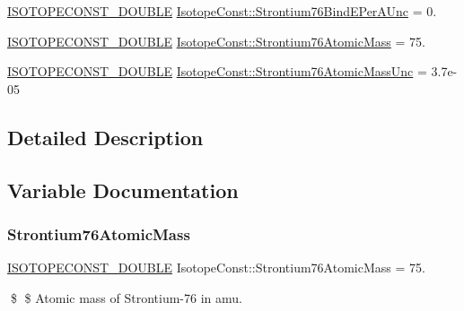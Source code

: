 \begin{DoxyCompactItemize}
\mbox{\hyperlink{group___isotope_const-_macros_ga8f45a7272ce02c0b4c65c44636ed719a}{I\+S\+O\+T\+O\+P\+E\+C\+O\+N\+S\+T\+\_\+\+D\+O\+U\+B\+LE}} \mbox{\hyperlink{group___isotope_const-_strontium-_sr76_ga7e4ec5112468b72b5cb7cdde7d602de2}{Isotope\+Const\+::\+Strontium76\+Bind\+E\+Per\+A\+Unc}} = 0.
\item 
\mbox{\hyperlink{group___isotope_const-_macros_ga8f45a7272ce02c0b4c65c44636ed719a}{I\+S\+O\+T\+O\+P\+E\+C\+O\+N\+S\+T\+\_\+\+D\+O\+U\+B\+LE}} \mbox{\hyperlink{group___isotope_const-_strontium-_sr76_gaf914588a7367cca70cf631ccae5920e5}{Isotope\+Const\+::\+Strontium76\+Atomic\+Mass}} = 75.
\item 
\mbox{\hyperlink{group___isotope_const-_macros_ga8f45a7272ce02c0b4c65c44636ed719a}{I\+S\+O\+T\+O\+P\+E\+C\+O\+N\+S\+T\+\_\+\+D\+O\+U\+B\+LE}} \mbox{\hyperlink{group___isotope_const-_strontium-_sr76_ga453a365331c04262592d48073737b5bf}{Isotope\+Const\+::\+Strontium76\+Atomic\+Mass\+Unc}} = 3.\+7e-\/05
\end{DoxyCompactItemize}


\subsection{Detailed Description}


\subsection{Variable Documentation}
\mbox{\label{group___isotope_const-_strontium-_sr76_gaf914588a7367cca70cf631ccae5920e5}} 
\subsubsection{\texorpdfstring{Strontium76\+Atomic\+Mass}{Strontium76AtomicMass}}
{\footnotesize\ttfamily \mbox{\hyperlink{group___isotope_const-_macros_ga8f45a7272ce02c0b4c65c44636ed719a}{I\+S\+O\+T\+O\+P\+E\+C\+O\+N\+S\+T\+\_\+\+D\+O\+U\+B\+LE}} Isotope\+Const\+::\+Strontium76\+Atomic\+Mass = 75.}

\$ \$ Atomic mass of Strontium-\/76 in amu. \mbox{\label{group___isotope_const-_strontium-_sr76_ga453a365331c04262592d48073737b5bf}} 
